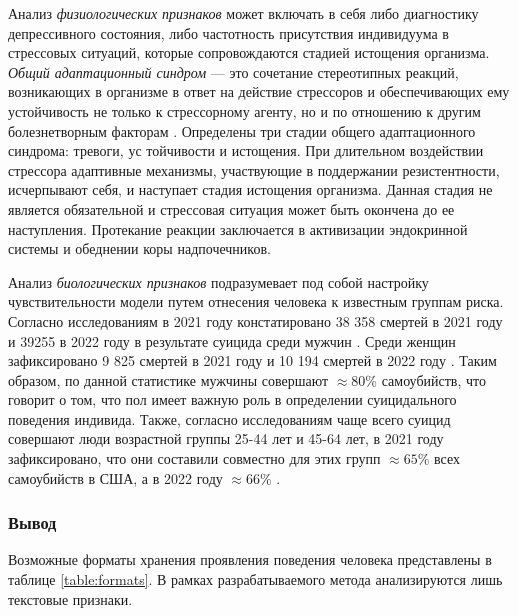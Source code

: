 Анализ \textit{физиологических признаков} может включать в себя либо диагностику депрессивного состояния, либо частотность присутствия индивидуума в стрессовых ситуаций, которые сопровождаются стадией истощения организма. \textit{Общий адаптационный синдром} --- это сочетание стереотипных реакций, возникающих в организме в ответ на действие стрессоров и обеспечивающих ему устойчивость не только к стрессорному агенту, но и по отношению к другим болезнетворным факторам \cite{stressAndPatology}. Определены три стадии общего адаптационного синдрома: тревоги, ус\- тойчивости и истощения. При длительном воздействии стрессора адаптивные механизмы, участвующие в поддержании резистентности, исчерпывают себя, и наступает стадия истощения организма. Данная стадия не является обязательной и стрессовая ситуация может быть окончена до ее наступления. Протекание реакции заключается в активизации эндокринной системы и обеднении коры надпочечников. \cite{stressAndPatology}

Анализ \textit{биологических признаков} подразумевает под собой настройку чувствительности модели путем отнесения человека к известным группам риска. Согласно исследованиям в 2021 году констатировано 38 358 смертей в 2021 году и 39255 в 2022 году в результате суицида среди мужчин \cite{suicideStats}. Среди женщин зафиксировано 9 825 смертей в 2021 году и 10 194 смертей в 2022 году \cite{suicideStats}. Таким образом, по данной статистике мужчины совершают $\approx 80\%$ самоубийств, что говорит о том, что пол имеет важную роль в определении суицидального поведения индивида. Также, согласно исследованиям чаще всего суицид совершают люди возрастной группы 25-44 лет и 45-64 лет, в 2021 году зафиксировано, что они составили совместно для этих групп $\approx 65 \%$ всех самоубийств в США, а в 2022 году $\approx 66\%$ \cite{suicideStats}.

\subsubsection*{Вывод}

Возможные форматы хранения проявления поведения человека представлены в таблице \ref{table:formats}. В рамках разрабатываемого метода анализируются лишь текстовые признаки.

